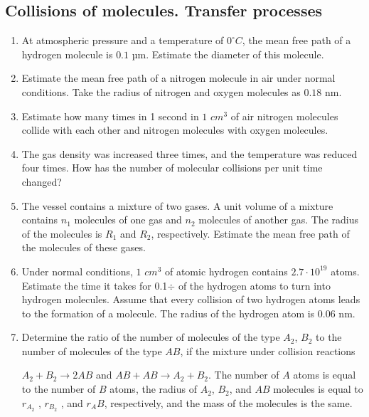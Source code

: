 \documentclass{article}
\begin{document}
\subsection{Collisions of molecules. Transfer processes}

\begin{enumerate}[label=5.3.\arabic*]

\item At atmospheric pressure and a temperature of $0^{\circ} C$, the mean free path of a hydrogen molecule is $0.1$ µm. Estimate the diameter of this molecule.

\item Estimate the mean free path of a nitrogen molecule in air under normal conditions. Take the radius of nitrogen and oxygen molecules as $0.18$ nm.

\item Estimate how many times in 1 second in $1$ $cm^3$ of air nitrogen molecules collide with each other and nitrogen molecules with oxygen molecules.

\item The gas density was increased three times, and the temperature was reduced four times. How has the number of molecular collisions per unit time changed?

\item The vessel contains a mixture of two gases. A unit volume of a mixture contains $n_1$ molecules of one gas and $n_2$ molecules of another gas. The radius of the molecules is $R_1$ and $R_2$, respectively. Estimate the mean free path of the molecules of these gases.

\item Under normal conditions, $1$ $cm^3$ of atomic hydrogen contains $2.7 \cdot 10^19$ atoms. Estimate the time it takes for 0.1$\div$ of the hydrogen atoms to turn into hydrogen molecules. Assume that every collision of two hydrogen atoms leads to the formation of a molecule. The radius of the hydrogen atom is $0.06$ nm.

\item Determine the ratio of the number of molecules of the type $A_2$, $B_2$ to the number of molecules of the type $AB$, if the mixture under collision reactions

$A_2 + B_2 \to 2AB$ and $AB + AB \to A_2 + B_2$. The number of $A$ atoms is equal to the number of $B$ atoms, the radius of $A_2$, $B_2$, and $AB$ molecules is equal to $r_{A_2}$ , $r_{B_2}$ , and $r_AB$, respectively, and the mass of the molecules is the same.


\end{enumerate}
\end{document}
